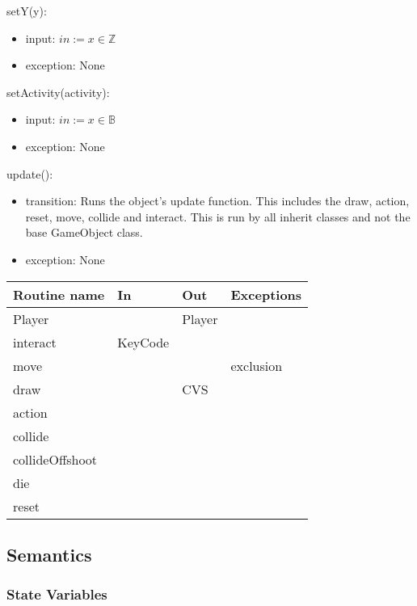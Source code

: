 \documentclass[12pt]{article}
\begin{document}
\noindent setY(y):
\begin{itemize}
    \item input: $in := x \in \mathbb{Z}$
    \item exception: None
\end{itemize}

\noindent setActivity(activity):
\begin{itemize}
    \item input: $in := x \in \mathbb{B}$
    \item exception: None
\end{itemize}

\noindent update():
\begin{itemize}
    \item transition: Runs the object's update function. This includes the draw, action, reset, move, collide and interact. This is run by all inherit classes and not the base GameObject class.
    \item exception: None
\end{itemize}

\newpage

\begin{tabular}{| l | l | l | l |}
    \hline
    \textbf{Routine name} & \textbf{In} & \textbf{Out} & \textbf{Exceptions}\\
    \hline
    Player & ~ & Player & ~\\
    \hline
    interact & KeyCode & ~ & ~\\
    \hline
    move & ~ & ~ & exclusion\\
    \hline
    draw & ~ & CVS & ~\\
    \hline
    action & ~ & ~ & ~\\
    \hline
    collide & ~ & ~ & ~\\
    \hline
    collideOffshoot & ~ & ~ & ~\\
    \hline
    die & ~ & ~ & ~\\
    \hline
    reset & ~ & ~ & ~\\
    \hline
\end{tabular}

\subsection* {Semantics}

\subsubsection* {State Variables}
\end{document}
